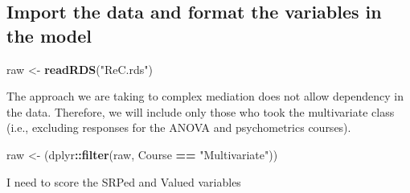 \documentclass[
  11pt,
]{book}
\newenvironment{Shaded}{\begin{snugshade}}{\end{snugshade}}
\newcommand{\FloatTok}[1]{\textcolor[rgb]{0.06,0.06,0.06}{#1}}
\newcommand{\FunctionTok}[1]{\textcolor[rgb]{0.27,0.27,0.27}{\textbf{#1}}}
\newcommand{\NormalTok}[1]{#1}
\newcommand{\OtherTok}[1]{\textcolor[rgb]{0.37,0.37,0.37}{#1}}
\newcommand{\SpecialCharTok}[1]{\textcolor[rgb]{0.43,0.43,0.43}{\textbf{#1}}}
\newcommand{\StringTok}[1]{\textcolor[rgb]{0.5,0.5,0.5}{#1}}
\begin{document}
\hypertarget{import-the-data-and-format-the-variables-in-the-model-2}{%
\subsection*{Import the data and format the variables in the model}\label{import-the-data-and-format-the-variables-in-the-model-2}}


\begin{Shaded}
\begin{Highlighting}[]
\NormalTok{raw }\OtherTok{\textless{}{-}} \FunctionTok{readRDS}\NormalTok{(}\StringTok{"ReC.rds"}\NormalTok{)}
\end{Highlighting}
\end{Shaded}

The approach we are taking to complex mediation does not allow dependency in the data. Therefore, we will include only those who took the multivariate class (i.e., excluding responses for the ANOVA and psychometrics courses).

\begin{Shaded}
\begin{Highlighting}[]
\NormalTok{raw }\OtherTok{\textless{}{-}}\NormalTok{ (dplyr}\SpecialCharTok{::}\FunctionTok{filter}\NormalTok{(raw, Course }\SpecialCharTok{==} \StringTok{"Multivariate"}\NormalTok{))}
\end{Highlighting}
\end{Shaded}

I need to score the SRPed and Valued variables

\begin{Shaded}
\end{Shaded}
\end{document}

